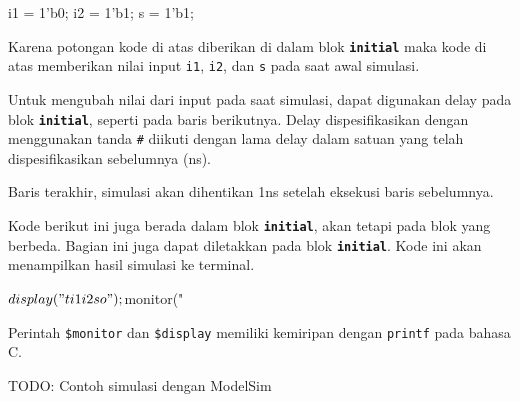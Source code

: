 \begin{verilogcode}
i1 = 1'b0;
i2 = 1'b1;
s  = 1'b1;
\end{verilogcode}

Karena potongan kode di atas diberikan di dalam blok {\tt\textbf{initial}}
maka kode di atas memberikan nilai input {\tt i1}, {\tt i2}, dan {\tt s}
pada saat awal simulasi.

Untuk mengubah nilai dari input pada saat simulasi, dapat digunakan delay
pada blok {\tt\textbf{initial}}, seperti pada baris berikutnya. Delay
dispesifikasikan dengan menggunakan tanda {\tt \#} diikuti dengan lama delay
dalam satuan yang telah dispesifikasikan sebelumnya (ns).

Baris terakhir, simulasi akan dihentikan 1ns setelah eksekusi baris sebelumnya.

Kode berikut ini juga berada dalam blok {\tt\textbf{initial}}, akan
tetapi pada blok yang berbeda. Bagian ini
juga dapat diletakkan pada blok {\tt\textbf{initial}}.
Kode ini akan menampilkan hasil simulasi ke terminal.
\begin{verilogcode}
$display("  t   i1   i2   s    o");
$monitor("%
\end{verilogcode}

Perintah \verb|$monitor| dan \verb|$display| memiliki kemiripan
dengan \verb|printf| pada bahasa C.

{\color{red} TODO: Contoh simulasi dengan ModelSim}


